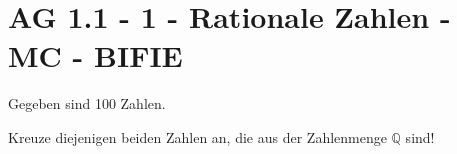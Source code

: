 \section{AG 1.1 - 1 - Rationale Zahlen - MC - BIFIE}

\begin{beispiel}[AG 1.1]{1} %
				Gegeben sind 100 Zahlen.
				
				Kreuze diejenigen beiden Zahlen an, die aus der Zahlenmenge $\mathbb{Q}$ sind!
\end{beispiel}
